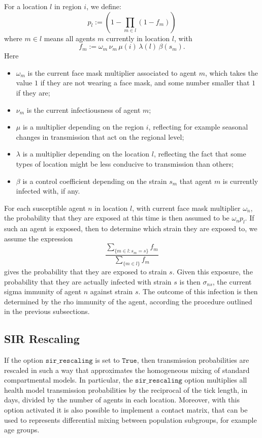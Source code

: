 \documentclass[10pt,letterpaper]{article}
\begin{document}
For a location $l$ in region $i$, we define:
\begin{equation*}
p_l := \left(1 - \prod_{m \in l} (1 - f_m)\right)
\end{equation*}
where $m \in l$ means all agents $m$ currently in location $l$, with
\begin{equation*}
f_m  := \omega_m\, \nu_m\, \mu(i)\, \lambda(l)\, \beta(s_m).
\end{equation*}
Here
\begin{itemize}
\item $\omega_m$ is the current face mask multiplier associated to agent $m$, which takes the value $1$ if they are not wearing a face mask, and some number smaller that $1$ if they are;
\item $\nu_m$ is the current infectiousness of agent $m$;
\item $\mu$ is a multiplier depending on the region $i$, reflecting for example seasonal changes in transmission that act on the regional level;
\item $\lambda$ is a multiplier depending on the location $l$, reflecting the fact that some types of location might be less conducive to transmission than others;
\item $\beta$ is a control coefficient depending on the strain $s_m$ that agent $m$ is currently infected with, if any.
\end{itemize}
For each susceptible agent $n$ in location $l$, with current face mask multiplier $\omega_n$, the probability that they are exposed at this time is then assumed to be $\omega_n p_l$. If such an agent is exposed, then to determine which strain they are exposed to, we assume the expression
\begin{equation*}
\frac{\sum_{\{m \in l: s_m = s\}} f_m}{\sum_{\{m \in l\}} f_m}
\end{equation*}
gives the probability that they are exposed to strain $s$. Given this exposure, the probability that they are actually infected with strain $s$ is then $\sigma_{ns}$, the current sigma immunity of agent $n$ against strain $s$. The outcome of this infection is then determined by the rho immunity of the agent, according the procedure outlined in the previous subsections.

\subsection{SIR Rescaling}

If the option $\texttt{sir{\_}rescaling}$ is set to $\texttt{True}$, then transmission probabilities are rescaled in such a way that approximates the homogeneous mixing of standard compartmental models. In particular, the $\texttt{sir{\_}rescaling}$ option multiplies all health model transmission probabilities by the reciprocal of the tick length, in days, divided by the number of agents in each location. Moreover, with this option activated it is also possible to implement a contact matrix, that can be used to represents differential mixing between population subgroups, for example age groups.
\end{document}
